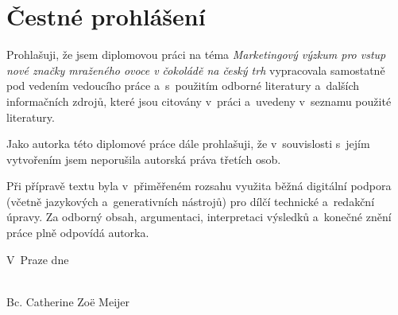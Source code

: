 \chapter*{Čestné prohlášení}

Prohlašuji, že jsem diplomovou práci na téma \emph{Marketingový výzkum pro vstup nové značky mraženého ovoce v čokoládě na český trh} vypracovala samostatně pod vedením vedoucího práce a~s~použitím odborné literatury a~dalších informačních zdrojů, které jsou citovány v~práci a~uvedeny v~seznamu použité literatury.

Jako autorka této diplomové práce dále prohlašuji, že v~souvislosti s~jejím vytvořením jsem neporušila autorská práva třetích osob.

Při přípravě textu byla v~přiměřeném rozsahu využita běžná digitální podpora (včetně jazykových a~generativních nástrojů) pro dílčí technické a~redakční úpravy. Za odborný obsah, argumentaci, interpretaci výsledků a~konečné znění práce plně odpovídá autorka.

\vspace{30mm}

\noindent V~Praze dne \makebox[4cm]{\dotfill}

\hfill\parbox{6cm}{%
  \centering
  \makebox[5cm]{\dotfill}\\
  Bc. Catherine Zoë Meijer
}

\newpage

